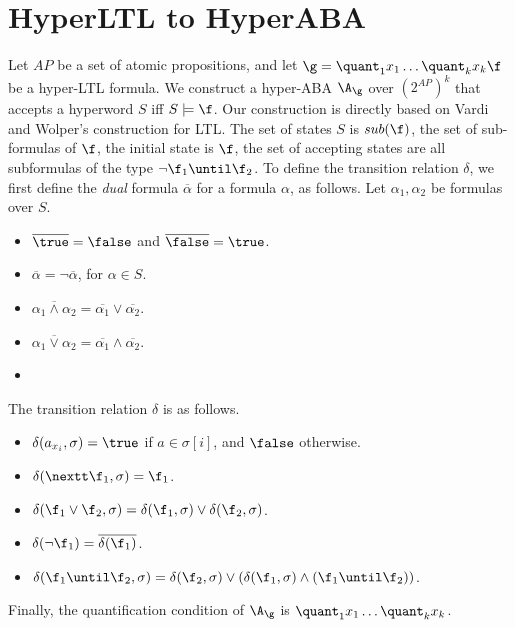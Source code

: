 \section{HyperLTL to HyperABA}


Let $AP$ be a set of atomic propositions, and let $\g = \quant_1 x_1 \ldots \quant_k x_k \f$ be a hyper-LTL formula. 
We construct a hyper-ABA $\A_\g$ over $(2^{AP})^k$ that accepts a hyperword $S$ iff $S\models\f$. Our construction is directly based on Vardi and Wolper's construction for LTL. 
The set of states $S$ is $sub(\f)$, the set of sub-formulas of $\f$, the initial state is $\f$, the set of accepting states are all subformulas of the type $\neg \f_1\until\f_2$.
To define the transition relation $\delta$, 
we first define the {\em dual} formula $\overline{\alpha}$ for a formula $\alpha$, as follows. Let $\alpha_1,\alpha_2$ be formulas over $S$. 
\begin{itemize}
    \item $\overline{\true} = \false$ and $\overline{\false}=\true$.
    \item $\overline{\alpha} = \neg\overline{\alpha}$, for $\alpha\in S$.
    \item $\overline{\alpha_1\wedge\alpha_2} = \overline{\alpha_1}\vee\overline{\alpha_2}$.
    \item $\overline{\alpha_1\vee \alpha_2} = \overline{\alpha_1}\wedge\overline{\alpha_2}$.
    \item

\end{itemize}

The transition relation $\delta$ is as follows. 
\begin{itemize}
\item $\delta(a_{x_i},\sigma) = \true$ if $a\in\sigma[i]$, and $\false$ otherwise. 
\item $\delta(\nextt \f_1, \sigma) =  \f_1$.
\item $\delta(\f_1\vee \f_2,\sigma) = \delta(\f_1,\sigma)\vee \delta(\f_2,\sigma)$.
\item $\delta(\neg \f_1) = \overline{\delta(\f_1)}$.
\item $\delta(\f_1 \until \f_2, \sigma) = \delta(\f_2,\sigma)\vee (\delta(\f_1,\sigma) \wedge (\f_1\until\f_2))$. 
\end{itemize}

Finally, the quantification condition of $\A_\g$ is $\quant_1 x_1 \ldots \quant_k x_k$. 